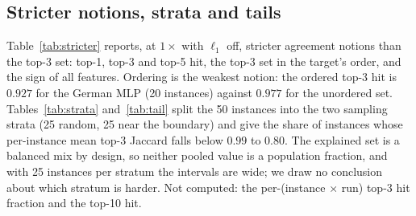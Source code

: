 \begin{table}[h]
\centering
\caption{Cells classed reliable / conditional / unreliable under alternative threshold sets $(h,e,s)$ (top-3 hit lower bound, median relative $L_2$, sign-agreement lower bound; the criteria for ``unreliable'' are unchanged), for all models, without LR, and for the MLP alone. The number of cells is in the header.}
\label{tab:verdictsens}

\end{table}

\subsection{Stricter notions, strata and tails}
\label{app:strata}
Table~\ref{tab:stricter} reports, at $1\times$ with $\ell_1$ off, stricter agreement notions than the top-3 set: top-1, top-3 and top-5 hit, the top-3 set in the target's order, and the sign of all features. Ordering is the weakest notion: the ordered top-3 hit is $0.927$ for the German MLP (20 instances) against $0.977$ for the unordered set. Tables~\ref{tab:strata} and~\ref{tab:tail} split the 50 instances into the two sampling strata (25 random, 25 near the boundary) and give the share of instances whose per-instance mean top-3 Jaccard falls below $0.99$ to $0.80$. The explained set is a balanced mix by design, so neither pooled value is a population fraction, and with 25 instances per stratum the intervals are wide; we draw no conclusion about which stratum is harder. Not computed: the per-(instance $\times$ run) top-3 hit fraction and the top-10 hit.

\begin{table}[h]
\centering
\caption{Stricter notions at $1\times$ (Kernel SHAP, $\ell_1$ off): mean with nested-bootstrap 95\% interval; $n$ instances (German MLP: 20).}
\label{tab:stricter}

\end{table}

{\footnotesize

\addtocounter{table}{-1}%
\label{tab:strata}
}

{\footnotesize

\addtocounter{table}{-1}%
\label{tab:tail}
}


